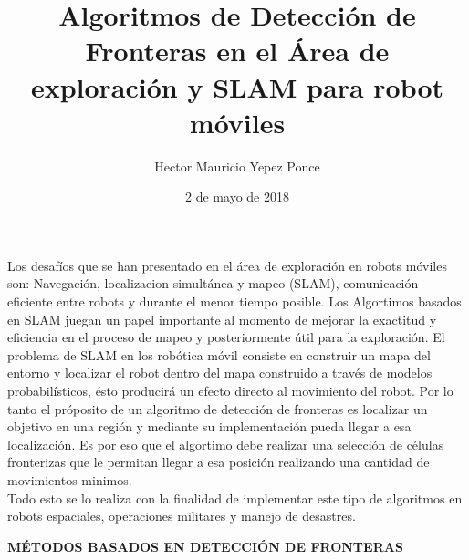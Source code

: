 \documentclass[12pt,a4paper]{article}
\author{Hector Mauricio Yepez Ponce}
\date{2 de mayo de 2018}
\title{Algoritmos de Detección de Fronteras en el Área de exploración y SLAM para robot móviles}
\begin{document}
\maketitle
Los desafíos que se han presentado en el área de exploración en robots móviles son: Navegación, localizacion simultánea y mapeo (SLAM), comunicación eficiente entre robots y durante el menor tiempo posible.
Los Algortimos basados en SLAM juegan un papel importante al momento de mejorar la exactitud y eficiencia en el proceso de mapeo y posteriormente útil para la exploración.
El problema de SLAM en los robótica móvil consiste en construir un mapa del entorno y localizar el robot dentro del mapa construido a través de modelos probabilísticos, ésto producirá un efecto directo al movimiento del robot.
Por lo tanto el próposito de un algoritmo de detección de fronteras es localizar un objetivo en una región y mediante su implementación pueda llegar a esa localización. Es por eso que el algortimo debe realizar una selección de células fronterizas que le permitan llegar a esa posición realizando una cantidad de movimientos minimos.\\
Todo esto se lo realiza con la finalidad de implementar este tipo de algoritmos en robots espaciales, operaciones militares y manejo de desastres.
\begin{center}
\textbf{MÉTODOS BASADOS EN DETECCIÓN DE FRONTERAS}
\end{center}
\end{document}
